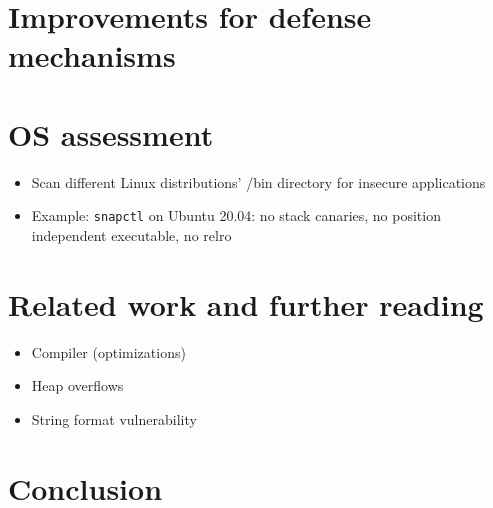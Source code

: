 \chapter{Improvements for defense mechanisms}
\label{chp:defense-mechanism-improvements}


\chapter{OS assessment}
\label{chp:os-assessment}

\begin{itemize}
	\item{Scan different Linux distributions' /bin directory for insecure applications}
	\item{Example: \texttt{snapctl} on Ubuntu 20.04: no stack canaries, no position independent executable, no \gls{relro}}
\end{itemize}
%

\chapter{Related work and further reading}
\label{chp:related-work}

\begin{itemize}
	\item{Compiler (optimizations)}
	\item{Heap overflows}
	\item{String format vulnerability}
\end{itemize}

\chapter{Conclusion}
\label{chp:conclusion}